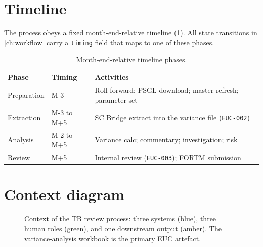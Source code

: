 \documentclass[11pt,a4paper,twoside]{report}
\begin{document}
\section{Timeline}

The process obeys a fixed month-end-relative timeline
(\cref{tab:timeline}). All state transitions in \cref{ch:workflow}
carry a \texttt{timing} field that maps to one of these phases.

\begin{table}[htbp]
\caption{Month-end-relative timeline phases.}\label{tab:timeline}
\centering
\small
\begin{tabularx}{\linewidth}{@{}llX@{}}
\toprule
\textbf{Phase} & \textbf{Timing} & \textbf{Activities} \\ \midrule
Preparation & M-3        & Roll forward; PSGL download; master refresh; parameter set \\
Extraction  & M-3 to M+5 & SC Bridge extract into the variance file (\texttt{EUC-002}) \\
Analysis    & M-2 to M+5 & Variance calc; commentary; investigation; risk \\
Review      & M+5        & Internal review (\texttt{EUC-003}); FORTM submission \\
\bottomrule
\end{tabularx}
\end{table}

\section{Context diagram}

\begin{figure}[htbp]
\centering
{}
\caption{Context of the TB review process: three systems (blue), three
human roles (green), and one downstream output (amber). The
variance-analysis workbook is the primary EUC artefact.}\label{fig:context}
\end{figure}
\end{document}
